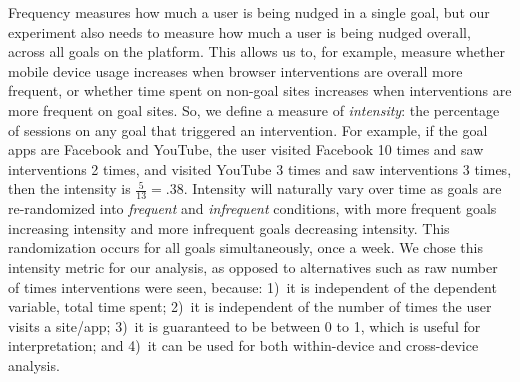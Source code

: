 
Frequency measures how much a user is being nudged in a single goal, but our experiment also needs to measure how much a user is being nudged overall, across all goals on the platform. This allows us to, for example, measure whether mobile device usage increases when browser interventions are overall more frequent, or whether time spent on non-goal sites increases when interventions are more frequent on goal sites. So, we define a measure of \textit{intensity}: the percentage of sessions on any goal that triggered an intervention. For example, if the goal apps are Facebook and YouTube, the user visited Facebook 10 times and saw interventions 2 times, and visited YouTube 3 times and saw interventions 3 times, then the intensity is $\frac{5}{13}=.38$. Intensity will naturally vary over time as goals are re-randomized into \textit{frequent} and \textit{infrequent} conditions, with more frequent goals increasing intensity and more infrequent goals decreasing intensity. This randomization occurs for all goals simultaneously, once a week. %
We chose this intensity metric for our analysis, as opposed to alternatives such as raw number of times interventions were seen, because: 1)~it is independent of the dependent variable, total time spent; 2)~it is independent of the number of times the user visits a site/app; 3)~it is guaranteed to be between 0 to 1, which is useful for interpretation; and 4)~it can be used for both within-device and cross-device analysis.

